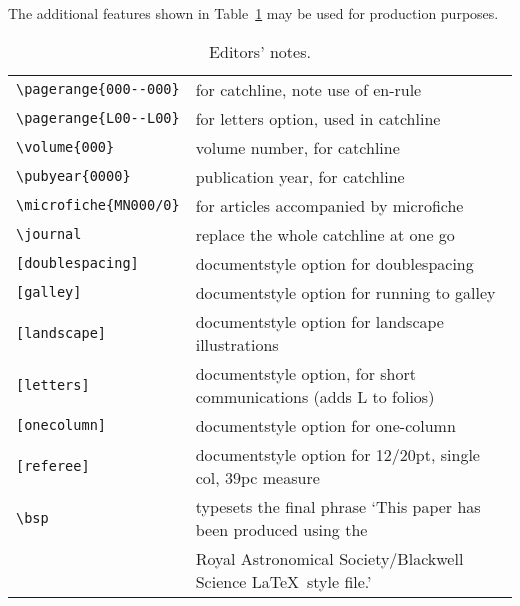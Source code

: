 The additional features shown in Table~\ref{editors} may be used for
production purposes.

\begin{table*}
\begin{minipage}{155mm}
\caption{Editors' notes.}
\label{editors}
\begin{tabular}{@{}lp{270pt}}
\verb"\pagerange{000--000}"& for catchline, note use of en-rule\\
\verb"\pagerange{L00--L00}"& for letters option, used in catchline\\
\verb"\volume{000}" & volume number, for catchline\\
\verb"\pubyear{0000}" & publication year, for catchline\\
\verb"\microfiche{MN000/0}" & for articles accompanied by microfiche\\
\verb"\journal" & replace the whole catchline at one go\\
\verb"[doublespacing]" & documentstyle option for doublespacing\\
\verb"[galley]" & documentstyle option for running to galley\\
\verb"[landscape]" & documentstyle option for landscape illustrations\\
\verb"[letters]" & documentstyle option, for short communications 
                   (adds L to folios)\\
\verb"[onecolumn]" & documentstyle option for one-column \\
\verb"[referee]" & documentstyle option for 12/20pt, single col, 
                   39pc measure\\
\verb"\bsp" & typesets the final phrase `This paper has been produced
              using the\\
            & Royal Astronomical Society/Blackwell Science \LaTeX\ style
              file.'\\
\end{tabular}
\end{minipage}
\end{table*}



\makeatletter
\def\thebiblio#1{%
 \list{}{\usecounter{dummy}%
         \labelwidth\z@
         \leftmargin 1.5em
         \itemsep \z@
         \itemindent-\leftmargin}
 \reset@font\small
 \parindent\z@
 \parskip\z@ plus .1pt\relax
 \def\newblock{\hskip .11em plus .33em minus .07em}
 \sloppy\clubpenalty4000\widowpenalty4000
 \sfcode`\.=1000\relax
}
\let\endthebiblio=\endlist
\makeatother


